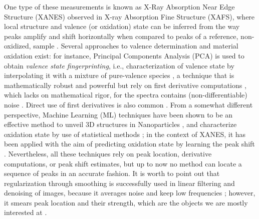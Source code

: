 \documentclass[%
 reprint,
 amsmath,amssymb,
 aps,
]{revtex4-1}
\begin{document}
One type of these measurements is known as X-Ray Absorption Near Edge Structure  (XANES) \cite{frenkel2012synchrotron,kuzmin2014exafs,newville2014fundamentals} observed in X-ray Absorption Fine Structure (XAFS),
where local structure and valence (or oxidation) state can be inferred from the way peaks amplify and shift horizontally when compared to peaks of a reference, non-oxidized, sample \cite{Zhao_structure,Belli,Peak_shift,lin2019highly,mao2017design}. Several approaches to valence determination and material oxidation exist: for instance,  Principal Components Analysis (PCA) is used to obtain \textit{valence state fingerprinting}, i.e., characterization of valence state by interpolating it with a mixture of pure-valence species \cite{PCA-valence}, a technique that is mathematically robust and powerful but rely on first derivative computations \cite{manceau2014estimating}, which lacks on mathematical rigor, for the spectra contains (non-differentiable) noise \cite{DEK}. Direct use of first derivatives is also common  \cite{First_derivative,ravel2005athena}. From a somewhat different perspective, Machine Learning (ML) techniques have been shown to be an effective method to unveil 3D structures in Nanoparticles \cite{ML-Timo-2019}, and characterize oxidation state by use of statistical methods \cite{zheng2018automated}; in the context of XANES, it has been applied with the aim of predicting oxidation state by learning the peak shift  \cite{miyazato2019automatic}. Nevertheless, all these techniques rely on peak location, derivative computations, or peak shift estimates, but up to now no method can locate a sequence of peaks in an accurate fashion. It is worth to point out that regularization through smoothing is successfully used in linear filtering and denoising of images, because it averages noise and keep low frequencies \cite{Mallat}; however, it smears peak location and their strength, which are the objects we are mostly interested at \cite[\S 6]{HaTiFr}.
      \newline
 \indent
\end{document}
